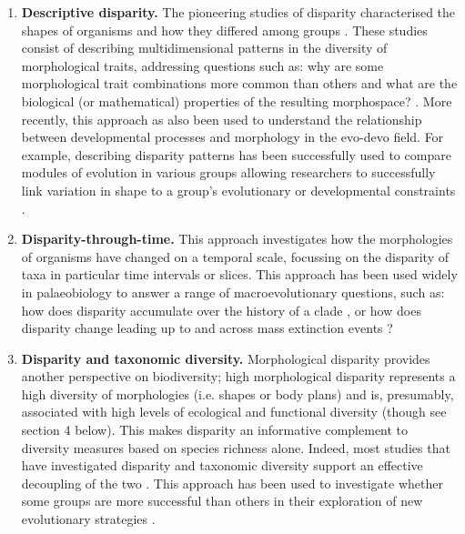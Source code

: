 \documentclass[12pt,letterpaper]{article}
\begin{document}
\begin{enumerate}

	\item \textbf{Descriptive disparity.} The pioneering studies of disparity characterised the shapes of organisms and how they differed among groups \citep{Foote1995-do, Briggs1992-pd}.
	These studies consist of describing multidimensional patterns in the diversity of morphological traits, addressing questions such as: why are some morphological trait combinations more common than others and what are the biological (or mathematical) properties of the resulting morphospace? \citep{Foote1995-do, Raup1961-vx, Gerber2017-xi}.
    More recently, this approach as also been used to understand the relationship between developmental processes and morphology in the evo-devo field.
    For example, describing disparity patterns has been successfully used to compare modules of evolution in various groups \citep{goswami2010influence,bardua2019morphological} allowing researchers to successfully link variation in shape to a group's evolutionary or developmental constraints \citep{Hipsley2017}.

	\item \textbf{Disparity-through-time.} This approach investigates how the morphologies of organisms have changed on a temporal scale, focussing on the disparity of taxa in particular time intervals or slices.
	This approach has been used widely in palaeobiology to answer a range of macroevolutionary questions, such as: how does disparity accumulate over the history of a clade \citep{Guillerme2018-uj, Wright2017-jo}, or how does disparity change leading up to and across mass extinction events \citep{Friedman2010-ve}?

	\item \textbf{Disparity and taxonomic diversity.} Morphological disparity provides another perspective on biodiversity; high morphological disparity represents a high diversity of morphologies (i.e. shapes or body plans) and is, presumably, associated with high levels of ecological and functional diversity (though see section 4 below).
	This makes disparity an informative complement to diversity measures based on species richness alone. 
	Indeed, most studies that have investigated disparity and taxonomic diversity support an effective decoupling of the two
	\citep[e.g.][]{Fortey1996-kt, Moyne2007-jm, Ruta2013-iy, Hopkins2013-xt}.
	This approach has been used to investigate whether some groups are more successful than others in their exploration of new evolutionary strategies \citep{Losos2011-fq}.


\end{enumerate}
\end{document}
